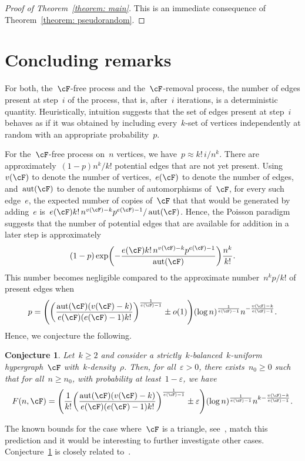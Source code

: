 \documentclass[11pt]{amsart}
\newcommand{\eps}{\varepsilon}
\DeclarePairedDelimiter{\paren}{\lparen}{\rparen}
\DeclareMathOperator{\aut}{aut}
\newtheorem{conjecture}[algocf]{Conjecture}
\theoremstyle{definition}
\numberwithin{equation}{section}
\begin{document}
	\begin{proof}[Proof of Theorem~\ref{theorem: main}]
		This is an immediate consequence of Theorem~\ref{theorem: pseudorandom}.
	\end{proof}
	
	\section{Concluding remarks}\label{section: concluding remarks}
	For both, the~$\cF$-free process and the~$\cF$-removal process, the number of edges present at step~$i$ of the process, that is, after~$i$ iterations, is a deterministic quantity.
	Heuristically, intuition suggests that the set of edges present at step~$i$ behaves as if it was obtained by including every~$k$-set of vertices independently at random with an appropriate probability~$p$.
	
	For the~$\cF$-free process on~$n$ vertices, we have~$p\approx k!\,i/n^k$.
	There are approximately~$(1-p)n^k/k!$ potential edges that are not yet present.
	Using~$v(\cF)$ to denote the number of vertices,~$e(\cF)$ to denote the number of edges, and~$\aut(\cF)$ to denote the number of automorphisms of~$\cF$, for every such edge~$e$, the expected number of copies of~$\cF$ that that would be generated by adding~$e$ is~$e(\cF)k!\,n^{v(\cF)-k}p^{e(\cF)-1}/\aut(\cF)$.
	Hence, the Poisson paradigm suggests that the number of potential edges that are available for addition in a later step is approximately
	\begin{equation*}
		(1-p)\exp\paren[\bigg]{-\frac{e(\cF)k!\, n^{v(\cF)-k}p^{e(\cF)-1}}{\aut(\cF)}}\frac{n^k}{k!}.
	\end{equation*}
	This number becomes negligible compared to the approximate number~$n^kp/k!$ of present edges when
	\begin{equation*}
		p=\paren[\Bigg]{ \paren[\bigg]{ \frac{\aut(\cF)(v(\cF)-k)}{e(\cF)(e(\cF)-1)k!}}^{\frac{1}{e(\cF)-1}} \pm o(1) }(\log n)^{\frac{1}{e(\cF)-1}}  n^{-\frac{v(\cF)-k}{e(\cF)-1}}.
	\end{equation*}
	Hence, we conjecture the following.
	\begin{conjecture}\label{conjecture: free}
		Let~$k\geq 2$ and consider a strictly~$k$-balanced~$k$-uniform hypergraph~$\cF$ with~$k$-density~$\rho$.
		Then, for all~$\eps>0$, there exists~$n_0\geq 0$ such that for all~$n\geq n_0$, with probability at least~$1-\eps$, we have
		\begin{equation*}
			F(n,\cF)=\paren[\Bigg]{ \frac{1}{k!}\paren[\bigg]{ \frac{\aut(\cF)(v(\cF)-k)}{e(\cF)(e(\cF)-1)k!}}^{\frac{1}{e(\cF)-1}} \pm \eps }(\log n)^{\frac{1}{e(\cF)-1}}  n^{k-\frac{v(\cF)-k}{e(\cF)-1}}.
		\end{equation*}
	\end{conjecture}
	The known bounds for the case where~$\cF$ is a triangle, see~\cite{BK:21,PGM:20}, match this prediction and it would be interesting to further investigate other cases.
	Conjecture~\ref{conjecture: free} is closely related to~\cite[Conjecture~13.1]{BK:10}.
	
\end{document}
